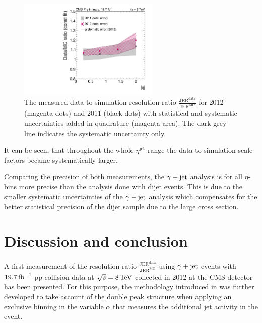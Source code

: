 \begin{figure}[b]
 \centering
    \includegraphics[width=0.6\textwidth]{figures/resolution/results/resultsComparisonFINAL.pdf}
  \caption{The measured data to simulation resolution ratio $\frac{\text{JER}^{\text{data}}}{\text{JER}^{\text{MC}}}$ for 2012 (magenta dots) and 2011 (black dots)
           with statistical and systematic uncertainties added in quadrature (magenta area). The dark grey line indicates the systematic uncertainty only.}
  \label{fig:RatioFinal}
\end{figure}

It can be seen, that throughout the whole $\eta^{\text{jet}}$-range the data to simulation scale factors became systematically larger. 


Comparing the precision of both measurements, the $\gamma + \text{jet}$ analysis is for all $\eta$-bins more precise than the analysis done with dijet events.
This is due to the smaller systematic uncertainties of the $\gamma + \text{jet}$ analysis which compensates for the better statistical precision of the dijet sample due to the large 
cross section.




\FloatBarrier
\chapter{Discussion and conclusion}
A first measurement of the resolution ratio $\frac{\text{JER}^{\text{data}}}{\text{JER}^{\text{MC}}}$ 
using $\gamma + \text{jet}$ events with $19.7\,\text{fb}^{-1}$ pp collision data at $\sqrt{s}=8 \,\text{Te}\kern-0.06667em\text{V}$ collected in 2012 at the CMS detector has been presented. 
For this purpose, the methodology introduced in \cite{CMS-AN-2010-076}
was further developed to take account of the double peak structure when applying an exclusive binning in the variable $\alpha$ 
that measures the additional jet activity in the event.

